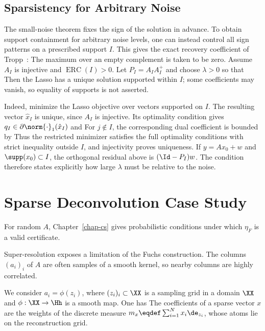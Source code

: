 \subsection{Sparsistency for Arbitrary Noise}

The small-noise theorem fixes the sign of the solution in advance. To obtain support containment for arbitrary noise levels, one can instead control all sign patterns on a prescribed support $I$. This gives the exact recovery coefficient of Tropp~\cite{Tropp2006JustRelax}:
The maximum over an empty complement is taken to be zero. Assume $A_I$ is injective and $\operatorname{ERC}(I)>0$. Let $P_I=A_IA_I^+$ and choose $\lambda>0$ so that
Then the Lasso has a unique solution supported within $I$; some coefficients may vanish, so equality of supports is not asserted.

Indeed, minimize the Lasso objective over vectors supported on $I$. The resulting vector $\hat x_I$ is unique, since $A_I$ is injective. Its optimality condition gives $q_I\in\partial\norm{\cdot}_1(\hat x_I)$ and
For $j\notin I$, the corresponding dual coefficient is bounded by
Thus the restricted minimizer satisfies the full optimality conditions with strict inequality outside $I$, and injectivity proves uniqueness. If $y=Ax_0+w$ and $\supp(x_0)\subset I$, the orthogonal residual above is $(\Id-P_I)w$. The condition therefore states explicitly how large $\lambda$ must be relative to the noise.

\section{Sparse Deconvolution Case Study}

For random $A$, Chapter~\ref{chap-cs} gives probabilistic conditions under which $\eta_F$ is a valid certificate.

Super-resolution exposes a limitation of the Fuchs construction. The columns $(a_i)_i$ of $A$ are often samples of a smooth kernel, so nearby columns are highly correlated.

We consider $a_i=\phi(z_i)$, where $(z_i)_i \subset \XX$ is a sampling grid in a domain $\XX$ and $\phi : \XX \rightarrow \Hh$ is a smooth map. One has
The coefficients of a sparse vector $x$ are the weights of the discrete measure $m_{x} \eqdef \sum_{i=1}^N x_i \de_{z_i}$, whose atoms lie on the reconstruction grid.


